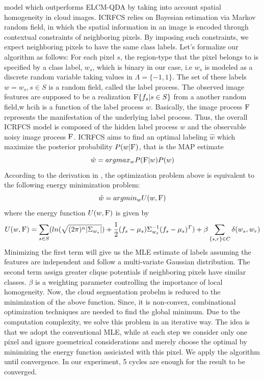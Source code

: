\documentclass[english]{article}\usepackage{graphicx, color}
\numberwithin{equation}{section}
\numberwithin{figure}{section}
\begin{document}
model which outperforms ELCM-QDA by taking into account spatial homogeneity
in cloud images. ICRFCS relies on Bayesian estimation via Markov random field, 
in which the spatial information in an image is encoded through contextual 
constraints of neighboring pixels. By imposing such constraints, we expect 
neighboring pixels to have the same class labels. Let's formalize our algorithm 
as follows: For each pixel $s$, the region-type that the pixel belongs to is 
specified by a class label, $w_s$, which is binary in our case, i.e $w_s$ is 
modeled as a discrete random variable taking values in $\Lambda=\{-1,1\}$. 
The set of these labels $w={w_s, s\in S}$ is a random field, called the label 
process. The observed image features are supposed to be a realization 
$\textsc{F}\{f_s|s\in S\}$ from a another random field,w hcih is a function of 
the label process $w$. Basically, the image process $\textsc{F}$ represents 
the manifestation of the underlying label process. Thus, the overall ICRFCS 
model is composed of the hidden label process $w$ and the observable noisy 
image process $\textsc{F}$. ICRFCS aims to find an optimal labeling $\hat{w}$ 
which maximize the posterior probability $P(w|\textsc{F})$, that is the MAP estimate
\begin{equation}
\hat{w}= arg max_{w} P(\textsc{F}|w) P(w)
\end{equation}
According to the derivation in \cite{kato06}, the optimization problem 
above is equivalent to the following energy minimization problem:
\begin{equation}
\hat{w} = arg min_w U(w, \textsc{F})
\end{equation}
where the energy function $U(w, \textsc{F})$ is given by
\begin{equation}
U(w, \textsc{F}) = \sum_{s\in S} (ln(\sqrt{(2\pi)^n|\Sigma_{w_s}|}) + \frac{1}{2}(f_s-\mu_s)\Sigma_{w_s}^{-1}(f_s-\mu_s)^T) + \beta \sum_{\{s,r\}\in C} \delta(w_s, w_r)
\end{equation}
Minimizing the first term will give us the MLE estimate of labels assuming 
the features are independent and follow a multi-variate Gaussian distribution. 
The second term assign greater clique potentials if neighboring pixels have 
similar classes. $\beta$ is a weighting parameter controlling the importance 
of local homogeneity. Now, the cloud segmentation probelm is reduced to the 
minimization of the above function. Since, it is non-convex, combinational 
optimization techniques are needed to find the global minimum. Due to the 
computation complexity, we solve this problem in an iterative way. The idea is 
that we adopt the conventional MLE, while at each step we consider only one 
pixel and ignore goemetrical considerations and merely choose the optimal by 
minimizing the energy function assiciated with this pixel. We apply the 
algorithm until convergence. In our experiment, 5 cycles are enough for the 
result to be converged.
\end{document}
